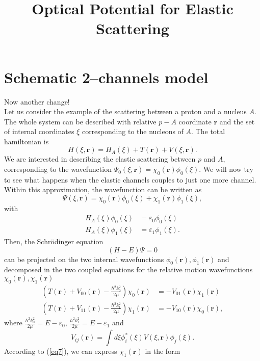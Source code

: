 \documentclass[a4paper,11pt]{article}
\title{Optical Potential for Elastic Scattering}
\begin{document}
\maketitle
\section{Schematic 2--channels model}
Now another change!\\
Let us  consider the example of the scattering between a proton and a nucleus $A$. The whole system can be described with relative $p-A$ coordinate $\mathbf{r}$ and the set of internal coordinates $\xi$ corresponding to the nucleons of $A$. The total hamiltonian is
\begin{equation}\label{eq1}
H(\xi,\mathbf{r})=H_{A}(\xi)+T(\mathbf{r})+V(\xi,\mathbf{r}).
\end{equation}
We are interested in describing  the elastic scattering between $p$ and $A$, corresponding to the wavefunction $\Psi_0(\xi,\mathbf{r})=\chi_0(\mathbf{r})\phi_0(\xi)$.
We will now try to see what happens when the elastic channels couples to just one more channel. Within this approximation, the wavefunction can be written as
\begin{equation}\label{eq2}
\Psi(\xi,\mathbf{r})=\chi_0(\mathbf{r})\phi_0(\xi)+\chi_1(\mathbf{r})\phi_1(\xi),
\end{equation}
with
\begin{eqnarray}\label{eq3}
\nonumber H_A(\xi)\phi_0(\xi)&=\varepsilon_0\phi_0(\xi)\\
H_A(\xi)\phi_1(\xi)&=\varepsilon_1\phi_1(\xi).
\end{eqnarray}
Then, the Schr\"{o}dinger equation
\begin{equation}\label{eq4}
(H-E)\Psi=0
\end{equation}
can be projected on the two internal wavefunctions $\phi_0(\mathbf{r}),\phi_1(\mathbf{r})$ and decomposed in the two coupled equations for the relative motion wavefunctions $\chi_0(\mathbf{r}),\chi_1(\mathbf{r})$
\begin{eqnarray}\label{eq5}
\nonumber \label{eq12}\left(T(\mathbf{r})+V_{00}(\mathbf{r})-\frac{\hbar^2k_0^2}{2 \mu}\right)\chi_0(\mathbf{r})&=-V_{01}(\mathbf{r})\chi_1(\mathbf{r})\\
\label{eq7} \left(T(\mathbf{r})+V_{11}(\mathbf{r})-\frac{\hbar^2k_1^2}{2 \mu}\right)\chi_1(\mathbf{r})&=-V_{10}(\mathbf{r})\chi_0(\mathbf{r}),
\end{eqnarray}
where $\tfrac{\hbar^2k_0^2}{2 \mu}=E-\varepsilon_0$, $\tfrac{\hbar^2k_1^2}{2 \mu}=E-\varepsilon_1$ and
\begin{equation}\label{eq6}
V_{ij}(\mathbf{r})=\int d\xi \phi^*_i(\xi)V(\xi,\mathbf{r})\phi_j(\xi).
\end{equation}
According to (\ref{eq7}), we can express $\chi_1(\mathbf{r})$ in the form
\end{document}
